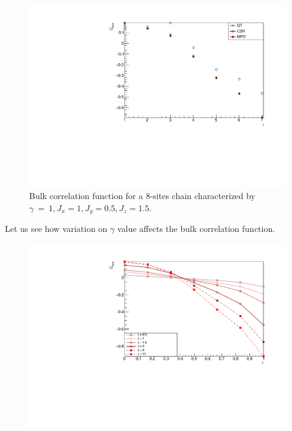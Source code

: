 \begin{figure}[H]
    \centering
    \includegraphics[scale=0.7]{Figures/8sites_comparison/CorrFuncBulk_8sJ10515.pdf}
    \caption{Bulk correlation function for a 8-sites chain characterized by $\gamma~=~1, J_x=1, J_y=0.5, J_z=1.5$.}
    \label{fig:my_label}
\end{figure}

Let us see how variation on $\gamma$ value affects the bulk correlation function.

\begin{figure}[H]
    \centering
    \includegraphics[scale=0.7]{Figures/8sites_CFBulkVSgamma.pdf}
    \caption{}
    \label{fig:my_label}
\end{figure}

